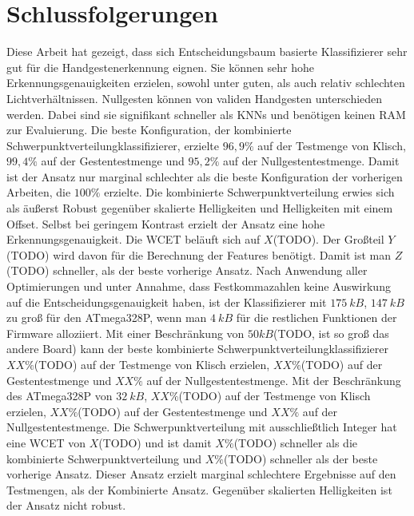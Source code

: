\chapter{Schlussfolgerungen}
Diese Arbeit hat gezeigt, dass sich Entscheidungsbaum basierte Klassifizierer sehr gut für die Handgestenerkennung eignen. Sie können sehr hohe Erkennungsgenauigkeiten erzielen, sowohl unter guten, als auch
relativ schlechten Lichtverhältnissen. Nullgesten können von validen Handgesten unterschieden werden. Dabei sind sie signifikant schneller als KNNs und benötigen keinen RAM zur Evaluierung.
\newline
\newline
Die beste Konfiguration, der kombinierte Schwerpunktverteilungklassifizierer, erzielte $96,9\%$ auf der Testmenge von Klisch, $99,4\%$ auf der Gestentestmenge und $95,2\%$ auf der Nullgestentestmenge. Damit
ist der Ansatz nur marginal schlechter als die beste Konfiguration der vorherigen Arbeiten, die $100\%$ erzielte. Die kombinierte Schwerpunktverteilung erwies sich als äußerst Robust gegenüber skalierte
Helligkeiten und Helligkeiten mit einem Offset. Selbst bei geringem Kontrast erzielt der Ansatz eine hohe Erkennungsgenauigkeit. Die WCET beläuft sich auf $X$(TODO). Der Großteil $Y$(TODO) wird davon für
die Berechnung der Features benötigt. Damit ist man $Z$(TODO) schneller, als der beste vorherige Ansatz. Nach Anwendung aller Optimierungen und unter Annahme, dass Festkommazahlen keine Auswirkung auf
die Entscheidungsgenauigkeit haben, ist der Klassifizierer mit $175\ kB$, $147\ kB$ zu groß für den ATmega328P, wenn man $4\ kB$ für die restlichen Funktionen der Firmware alloziiert.
\newline
\newline
Mit einer Beschränkung von $50 kB$(TODO, ist so groß das andere Board) kann der beste kombinierte Schwerpunktverteilungklassifizierer $XX\%$(TODO) auf der Testmenge von Klisch erzielen, $XX\%$(TODO) auf
der Gestentestmenge und $XX\%$ auf der Nullgestentestmenge. Mit der Beschränkung des ATmega328P von $32\ kB$, $XX\%$(TODO) auf der Testmenge von Klisch erzielen, $XX\%$(TODO) auf
der Gestentestmenge und $XX\%$ auf der Nullgestentestmenge.
\newline
\newline
Die Schwerpunktverteilung mit ausschließtlich Integer hat eine WCET von $X$(TODO) und ist damit $X\%$(TODO) schneller als die kombinierte Schwerpunktverteilung und $X\%$(TODO) schneller als der beste vorherige
Ansatz. Dieser Ansatz erzielt marginal schlechtere Ergebnisse auf den Testmengen, als der Kombinierte Ansatz. Gegenüber skalierten Helligkeiten ist der Ansatz nicht robust.

